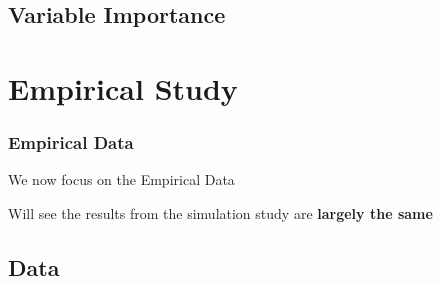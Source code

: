 \documentclass[aspectratio=169]{beamer}
\begin{document}

\subsection{Variable Importance}


\section{Empirical Study}

\begin{frame}
\frametitle{Empirical Data}
We now focus on the Empirical Data

Will see the results from the simulation study are \textbf{largely the same}
\end{frame}

\subsection{Data}
\end{document}
